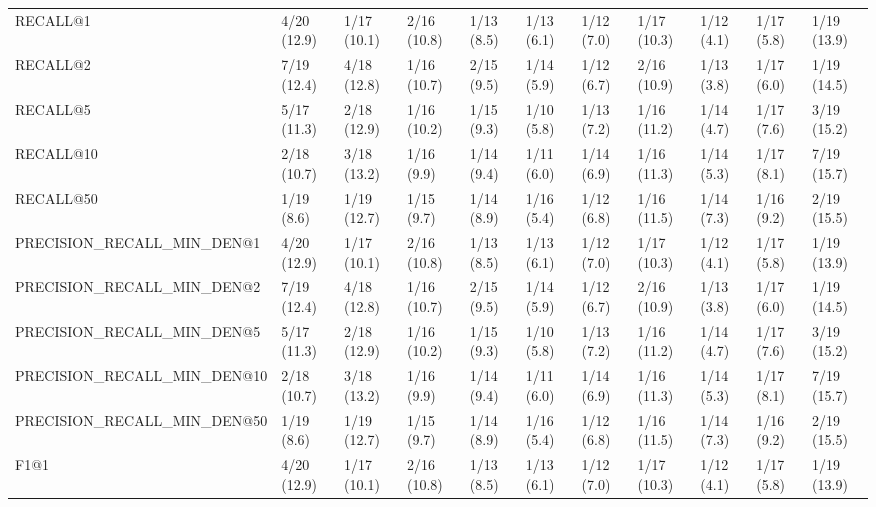 \begin{tabular}{lllllllllll}
RECALL@1                    &    4/20 (12.9) &    1/17 (10.1) &     2/16 (10.8) &       1/13 (8.5) &  1/13 (6.1) &  1/12 (7.0) &  1/17 (10.3) &     1/12 (4.1) &            1/17 (5.8) &        1/19 (13.9) \\
RECALL@2                    &    7/19 (12.4) &    4/18 (12.8) &     1/16 (10.7) &       2/15 (9.5) &  1/14 (5.9) &  1/12 (6.7) &  2/16 (10.9) &     1/13 (3.8) &            1/17 (6.0) &        1/19 (14.5) \\
RECALL@5                    &    5/17 (11.3) &    2/18 (12.9) &     1/16 (10.2) &       1/15 (9.3) &  1/10 (5.8) &  1/13 (7.2) &  1/16 (11.2) &     1/14 (4.7) &            1/17 (7.6) &        3/19 (15.2) \\
RECALL@10                   &    2/18 (10.7) &    3/18 (13.2) &      1/16 (9.9) &       1/14 (9.4) &  1/11 (6.0) &  1/14 (6.9) &  1/16 (11.3) &     1/14 (5.3) &            1/17 (8.1) &        7/19 (15.7) \\
RECALL@50                   &     1/19 (8.6) &    1/19 (12.7) &      1/15 (9.7) &       1/14 (8.9) &  1/16 (5.4) &  1/12 (6.8) &  1/16 (11.5) &     1/14 (7.3) &            1/16 (9.2) &        2/19 (15.5) \\
PRECISION_RECALL_MIN_DEN@1  &    4/20 (12.9) &    1/17 (10.1) &     2/16 (10.8) &       1/13 (8.5) &  1/13 (6.1) &  1/12 (7.0) &  1/17 (10.3) &     1/12 (4.1) &            1/17 (5.8) &        1/19 (13.9) \\
PRECISION_RECALL_MIN_DEN@2  &    7/19 (12.4) &    4/18 (12.8) &     1/16 (10.7) &       2/15 (9.5) &  1/14 (5.9) &  1/12 (6.7) &  2/16 (10.9) &     1/13 (3.8) &            1/17 (6.0) &        1/19 (14.5) \\
PRECISION_RECALL_MIN_DEN@5  &    5/17 (11.3) &    2/18 (12.9) &     1/16 (10.2) &       1/15 (9.3) &  1/10 (5.8) &  1/13 (7.2) &  1/16 (11.2) &     1/14 (4.7) &            1/17 (7.6) &        3/19 (15.2) \\
PRECISION_RECALL_MIN_DEN@10 &    2/18 (10.7) &    3/18 (13.2) &      1/16 (9.9) &       1/14 (9.4) &  1/11 (6.0) &  1/14 (6.9) &  1/16 (11.3) &     1/14 (5.3) &            1/17 (8.1) &        7/19 (15.7) \\
PRECISION_RECALL_MIN_DEN@50 &     1/19 (8.6) &    1/19 (12.7) &      1/15 (9.7) &       1/14 (8.9) &  1/16 (5.4) &  1/12 (6.8) &  1/16 (11.5) &     1/14 (7.3) &            1/16 (9.2) &        2/19 (15.5) \\
F1@1                        &    4/20 (12.9) &    1/17 (10.1) &     2/16 (10.8) &       1/13 (8.5) &  1/13 (6.1) &  1/12 (7.0) &  1/17 (10.3) &     1/12 (4.1) &            1/17 (5.8) &        1/19 (13.9) \\

\end{tabular}
